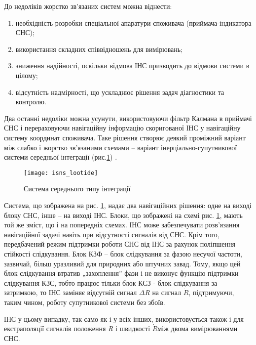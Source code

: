 До недоліків жорстко зв'язаних систем можна віднести:

\begin{enumerate}
\item необхідність розробки спеціальної апаратури споживача (приймача-індикатора СНС);
\item використання складних співвідношень для вимірювань;
\item зниження надійності, оскільки відмова ІНС призводить до відмови системи в цілому;
\item відсутність надмірності, що ускладнює рішення задач діагностики та контролю.
\end{enumerate}

Два 
останні недоліки можна усунути, використовуючи фільтр Калмана в приймачі СНС і перераховуючи 
навігаційну інформацію скоригованої ІНС у навігаційну систему координат споживача.   
Таке рішення створює деякий проміжний варіант між слабко і жорстко зв'язаними схемами -- варіант 
інерціально-супутникової системи середньої інтеграції (рис.\ref{fig:isns_lootide}) .

\begin{figure}[here]
\centering
\texttt{[image: isns\_lootide]}
\caption{Система середнього типу інтеграції}
\label{fig:isns_lootide}
\end{figure}

Система, що зображена на рис. \ref{fig:isns_lootide}, надає два навігаційних 
рішення: одне на виході блоку СНС, інше -- на виході ІНС. Блоки, що зображені на 
схемі рис. \ref{fig:isns_lootide}, мають той же зміст, що і на попередніх схемах. ІНС може забезпечувати 
розв'язання навігаційної задачі навіть при  відсутності сигналів від СНС. Крім того, 
передбачений режим підтримки роботи СНС від ІНС за рахунок поліпшення стійкості слідкування. 
Блок КЗФ -- блок слідкування за фазою  несучої частоти, зазвичай, більш уразливий 
для природних або штучних завад. Тому, якщо цей блок слідкування втратив „захоплення'' 
фази і не виконує функцію підтримки слідкування КЗС, тобто працює тільки блок КСЗ - 
блок слідкування за затримкою, то ІНС заміняє відсутній сигнал $\Delta$\textit{R} на 
сигнал $\dot{R} $, підтримуючи, таким чином, роботу супутникової системи 
без збоїв.

ІНС у цьому випадку, так само як і у всіх інших, використовується також і для екстраполяції 
сигналів положення \textit{R} і швидкості $\dot{R}$між двома вимірюваннями СНС.

